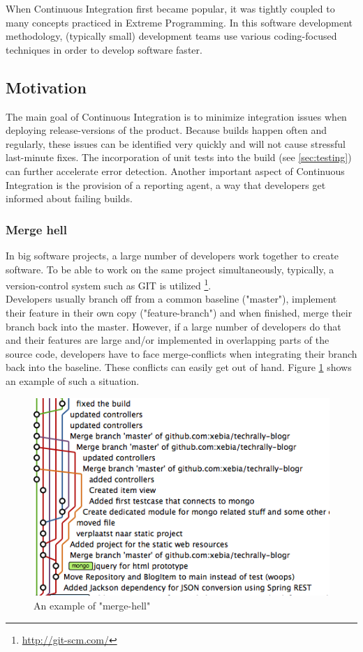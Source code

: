 When Continuous Integration first became popular, it was tightly coupled to many
concepts practiced in Extreme Programming. In this software development
methodology, (typically small) development teams use various coding-focused
techniques in order to develop software faster.

\subsection{Motivation}\label{sec:motivation}

The main goal of Continuous Integration is to minimize integration issues when
deploying release-versions of the product. Because builds happen often and
regularly, these issues can be identified very quickly and will not cause
stressful last-minute fixes. The incorporation of unit tests into the
build (see \ref{sec:testing}) can further accelerate error detection. Another
important aspect of Continuous Integration is the provision of a reporting
agent, a way that developers get informed about failing builds.

\subsubsection{Merge hell}\label{sec:merge-hell}

In big software projects, a large number of developers work together to create
software. To be able to work on the same project simultaneously, typically, a
version-control system such as GIT is utilized
\footnote{\url{http://git-scm.com/}}.\\

Developers usually branch off from a common baseline ("master"), implement their
feature in their own copy ("feature-branch") and when finished, merge their
branch back into the master. However, if a large number of developers do that
and their features are large and/or implemented in overlapping parts of the
source code, developers have to face merge-conflicts when integrating their
branch back into the baseline. These conflicts can easily get out of hand.
Figure \ref{fig:merge-hell} shows an example of such a situation.

\begin{figure}[h]
    \centering
    \includegraphics[width=0.6\linewidth]{images/merge-hell.png}
    \caption{An example of "merge-hell" \cite{mooij:2010}}
    \label{fig:merge-hell}
\end{figure}


